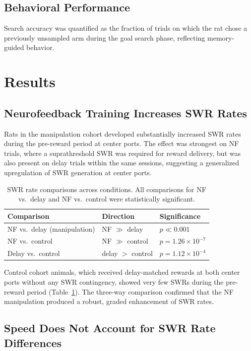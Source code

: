 \documentclass[11pt]{article}
\begin{document}
\subsection{Behavioral Performance}

Search accuracy was quantified as the fraction of trials on which the rat chose a previously unsampled arm during the goal search phase, reflecting memory-guided behavior.

\section{Results}

\subsection{Neurofeedback Training Increases SWR Rates}

Rats in the manipulation cohort developed substantially increased SWR rates during the pre-reward period at center ports. The effect was strongest on NF trials, where a suprathreshold SWR was required for reward delivery, but was also present on delay trials within the same sessions, suggesting a generalized upregulation of SWR generation at center ports.

\begin{table}[ht]
\centering
\caption{SWR rate comparisons across conditions. All comparisons for NF vs.\ delay and NF vs.\ control were statistically significant.}
\label{tab:swr_rate}
\begin{tabular}{lll}
\toprule
Comparison & Direction & Significance \\
\midrule
NF vs.\ delay (manipulation) & NF $\gg$ delay & $p \ll 0.001$ \\
NF vs.\ control & NF $\gg$ control & $p = 1.26 \times 10^{-7}$ \\
Delay vs.\ control & delay $>$ control & $p = 1.12 \times 10^{-4}$ \\
\bottomrule
\end{tabular}
\end{table}

Control cohort animals, which received delay-matched rewards at both center ports without any SWR contingency, showed very few SWRs during the pre-reward period (Table~\ref{tab:swr_rate}). The three-way comparison confirmed that the NF manipulation produced a robust, graded enhancement of SWR rates.

\subsection{Speed Does Not Account for SWR Rate Differences}
\end{document}
